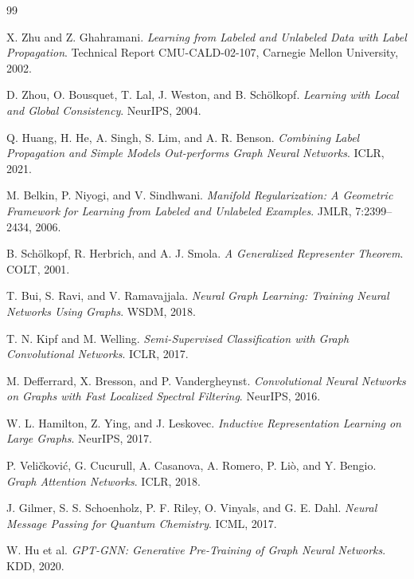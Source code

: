 \begin{notechapter}
\newpage

\begin{thebibliography}{99}

X. Zhu and Z. Ghahramani.
\textit{Learning from Labeled and Unlabeled Data with Label Propagation}.
Technical Report CMU-CALD-02-107, Carnegie Mellon University, 2002.

D. Zhou, O. Bousquet, T. Lal, J. Weston, and B. Sch\"{o}lkopf.
\textit{Learning with Local and Global Consistency}.
NeurIPS, 2004.

Q. Huang, H. He, A. Singh, S. Lim, and A. R. Benson.
\textit{Combining Label Propagation and Simple Models Out-performs Graph Neural Networks}.
ICLR, 2021.

M. Belkin, P. Niyogi, and V. Sindhwani.
\textit{Manifold Regularization: A Geometric Framework for Learning from
  Labeled and Unlabeled Examples}.
JMLR, 7:2399--2434, 2006.

B. Sch\"{o}lkopf, R. Herbrich, and A. J. Smola.
\textit{A Generalized Representer Theorem}.
COLT, 2001.

T. Bui, S. Ravi, and V. Ramavajjala.
\textit{Neural Graph Learning: Training Neural Networks Using Graphs}.
WSDM, 2018.

T. N. Kipf and M. Welling.
\textit{Semi-Supervised Classification with Graph Convolutional Networks}.
ICLR, 2017.

M. Defferrard, X. Bresson, and P. Vandergheynst.
\textit{Convolutional Neural Networks on Graphs with Fast Localized Spectral
  Filtering}.
NeurIPS, 2016.

W. L. Hamilton, Z. Ying, and J. Leskovec.
\textit{Inductive Representation Learning on Large Graphs}.
NeurIPS, 2017.

P. Veli\v{c}kovi\'{c}, G. Cucurull, A. Casanova, A. Romero, P. Li\`{o},
  and Y. Bengio.
\textit{Graph Attention Networks}.
ICLR, 2018.

J. Gilmer, S. S. Schoenholz, P. F. Riley, O. Vinyals, and G. E. Dahl.
\textit{Neural Message Passing for Quantum Chemistry}.
ICML, 2017.

W. Hu et al.
\textit{GPT-GNN: Generative Pre-Training of Graph Neural Networks}.
KDD, 2020.


\end{thebibliography}
\end{notechapter}
